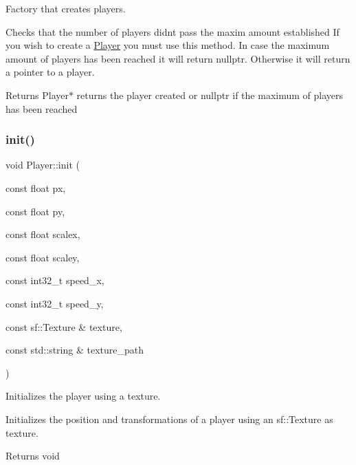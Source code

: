 Factory that creates players. 

Checks that the number of players didn\textquotesingle{}t pass the maxim amount established If you wish to create a \hyperlink{class_player}{Player} you must use this method. In case the maximum amount of players has been reached it will return nullptr. Otherwise it will return a pointer to a player.

\begin{DoxyReturn}{Returns}
Player$\ast$ returns the player created or nullptr if the maximum of players has been reached 
\end{DoxyReturn}
\mbox{\label{class_player_a233653ab275223ac155502c75ce3d6ae}} 
\subsubsection{\texorpdfstring{init()}{init()}\hspace{0.1cm}{\footnotesize\ttfamily [1/3]}}
{\footnotesize\ttfamily void Player\+::init (\begin{DoxyParamCaption}\item[{const float}]{px,  }\item[{const float}]{py,  }\item[{const float}]{scalex,  }\item[{const float}]{scaley,  }\item[{const int32\+\_\+t}]{speed\+\_\+x,  }\item[{const int32\+\_\+t}]{speed\+\_\+y,  }\item[{const sf\+::\+Texture \&}]{texture,  }\item[{const std\+::string \&}]{texture\+\_\+path }\end{DoxyParamCaption})}



Initializes the player using a texture. 

Initializes the position and transformations of a player using an sf\+::\+Texture as texture.

\begin{DoxyReturn}{Returns}
void 
\end{DoxyReturn}

